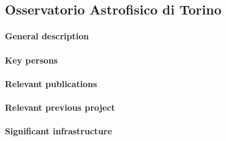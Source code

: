 \subsection{Osservatorio Astrofisico di Torino}
\label{sec:inaf}

\paragraph{General description}

\paragraph{Key persons}

\paragraph{Relevant publications}

\paragraph{Relevant previous project}

\paragraph{Significant infrastructure}